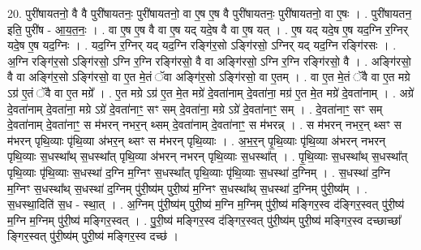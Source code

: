 \documentclass[17pt]{extarticle}
\begin{document}
20. पुरी॑षायतनो॒ वै वै पुरी॑षायतनः॒ पुरी॑षायतनो॒ वा ए॒ष ए॒ष वै पुरी॑षायतनः॒ पुरी॑षायतनो॒ वा ए॒षः । . पुरी॑षायतन॒ इति॒ पुरी॑ष - आ॒य॒त॒नः॒ । . वा ए॒ष ए॒ष वै वा ए॒ष यद् यदे॒ष वै वा ए॒ष यत् । . ए॒ष यद् यदे॒ष ए॒ष यद॒ग्नि र॒ग्निर् यदे॒ष ए॒ष यद॒ग्निः । . यद॒ग्नि र॒ग्निर् यद् यद॒ग्नि रङ्गि॑र॒सो ऽङ्गि॑रसो॒ ऽग्निर् यद् यद॒ग्नि रङ्गि॑रसः । . अ॒ग्नि रङ्गि॑र॒सो ऽङ्गि॑रसो॒ ऽग्नि र॒ग्नि रङ्गि॑रसो॒ वै वा अङ्गि॑रसो॒ ऽग्नि र॒ग्नि रङ्गि॑रसो॒ वै । . अङ्गि॑रसो॒ वै वा अङ्गि॑र॒सो ऽङ्गि॑रसो॒ वा ए॒त मे॒तं ॅवा अङ्गि॑र॒सो ऽङ्गि॑रसो॒ वा ए॒तम् । . वा ए॒त मे॒तं ॅवै वा ए॒त मग्रे ऽग्र॑ ए॒तं ॅवै वा ए॒त मग्रे᳚ । . ए॒त मग्रे ऽग्र॑ ए॒त मे॒त मग्रे॑ दे॒वता॑नाम् दे॒वता॑ना॒ मग्र॑ ए॒त मे॒त मग्रे॑ दे॒वता॑नाम् । . अग्रे॑ दे॒वता॑नाम् दे॒वता॑ना॒ मग्रे ऽग्रे॑ दे॒वता॑नाꣳ॒॒ सꣳ सम् दे॒वता॑ना॒ मग्रे ऽग्रे॑ दे॒वता॑नाꣳ॒॒ सम् । . दे॒वता॑नाꣳ॒॒ सꣳ सम् दे॒वता॑नाम् दे॒वता॑नाꣳ॒॒ स म॑भरन् नभर॒न् थ्सम् दे॒वता॑नाम् दे॒वता॑नाꣳ॒॒ स म॑भरन्न् । . स म॑भरन् नभर॒न् थ्सꣳ स म॑भरन् पृथि॒व्याः पृ॑थि॒व्या अ॑भर॒न् थ्सꣳ स म॑भरन् पृथि॒व्याः । . अ॒भ॒र॒न् पृ॒थि॒व्याः पृ॑थि॒व्या अ॑भरन् नभरन् पृथि॒व्याः स॒धस्था᳚थ् स॒धस्था᳚त् पृथि॒व्या अ॑भरन् नभरन् पृथि॒व्याः स॒धस्था᳚त् । . पृ॒थि॒व्याः स॒धस्था᳚थ् स॒धस्था᳚त् पृथि॒व्याः पृ॑थि॒व्याः स॒धस्था॑ द॒ग्नि म॒ग्निꣳ स॒धस्था᳚त् पृथि॒व्याः पृ॑थि॒व्याः स॒धस्था॑ द॒ग्निम् । . स॒धस्था॑ द॒ग्नि म॒ग्निꣳ स॒धस्था᳚थ् स॒धस्था॑ द॒ग्निम् पु॑री॒ष्य॑म् पुरी॒ष्य॑ म॒ग्निꣳ स॒धस्था᳚थ् स॒धस्था॑ द॒ग्निम् पु॑री॒ष्य᳚म् । . स॒धस्था॒दिति॑ स॒ध - स्था॒त् । . अ॒ग्निम् पु॑री॒ष्य॑म् पुरी॒ष्य॑ म॒ग्नि म॒ग्निम् पु॑री॒ष्य॑ मङ्गिर॒स्व द॑ङ्गिर॒स्वत् पु॑री॒ष्य॑ म॒ग्नि म॒ग्निम् पु॑री॒ष्य॑ मङ्गिर॒स्वत् । . पु॒री॒ष्य॑ मङ्गिर॒स्व द॑ङ्गिर॒स्वत् पु॑री॒ष्य॑म् पुरी॒ष्य॑ मङ्गिर॒स्व दच्छाच्छा᳚ ङ्गिर॒स्वत् पु॑री॒ष्य॑म् पुरी॒ष्य॑ मङ्गिर॒स्व दच्छ॑ । \newline
\end{document}
